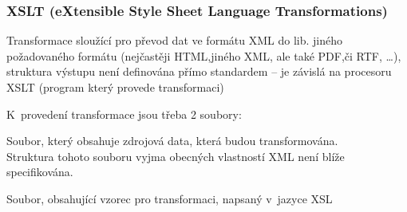 \subsubsection*{XSLT (eXtensible Style Sheet Language Transformations)}
\begin{pitemize}
	\item Transformace sloužící pro převod dat ve formátu XML do lib. jiného požadovaného formátu (nejčastěji HTML,jiného XML, ale také PDF,či RTF, \dots), struktura výstupu není definována přímo standardem – je závislá na procesoru XSLT (program který provede transformaci)
	\item K provedení transformace jsou třeba 2 soubory: 
	\begin{pitemize}
		\item Soubor, který obsahuje zdrojová data, která budou transformována.\\Struktura tohoto souboru vyjma obecných vlastností XML není blíže specifikována.
		\item Soubor, obsahující vzorec pro transformaci, napsaný v jazyce XSL
	\end{pitemize}
\end{pitemize}
